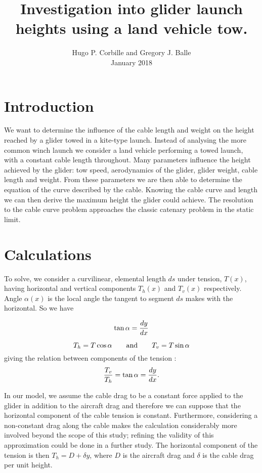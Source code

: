 \documentclass[11pt]{amsart}
\title{Investigation into glider launch heights using a land vehicle tow.}
\author{
    Hugo P. Corbille and Gregory J. Balle\\
     January 2018
}
\begin{document}

\maketitle


\section{Introduction}
We want to determine the influence of the cable length and weight on the height reached by a glider towed in a kite-type launch. Instead of analysing the more common winch launch we consider a land vehicle performing a towed launch, with a constant cable length throughout. Many parameters influence the height achieved by the glider: tow speed, aerodynamics of the glider, glider weight, cable length and weight. From these parameters we are then able to determine the equation of the curve described by the cable. Knowing the cable curve and length we can then derive the maximum height the glider could achieve. The resolution to the cable curve problem approaches the classic catenary problem in the static limit.

\section{Calculations}
To solve, we consider a curvilinear, elemental length $ds$ under tension, $T(x)$, having horizontal and vertical components $T_{h}(x)$ and $T_{v}(x)$ respectively. Angle $\alpha(x)$ is the local angle the tangent to segment $ds$ makes with the horizontal. So we have 

\begin{equation}
	\centering
	\tan{\alpha} = \frac{dy}{dx}
	\label{eq:deriv}
\end{equation}

\begin{equation}
	\centering
	T_h = T \cos{\alpha} \qquad \text{and} \qquad T_v = T \sin{\alpha}
	\label{eq:Th}
\end{equation}
giving the relation between components of the tension :
\begin{equation}
	\centering
	\frac{T_v}{T_h} = \tan{\alpha} = \frac{dy}{dx}.
	\label{eq:tension}
\end{equation}

In our model, we assume the cable drag to be a constant force applied to the glider in addition to the aircraft drag and therefore we can suppose that the horizontal component of the cable tension is constant. Furthermore, considering a non-constant drag along the cable makes the calculation considerably more involved beyond the scope of this study; refining the validity of this approximation could be done in a further study. The horizontal component of the tension is then $T_h = D + \delta y$, where $D$ is the aircraft drag and $\delta$ is the cable drag per unit height. 
\end{document}
